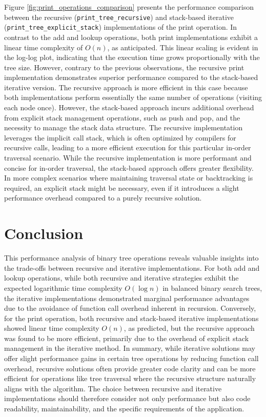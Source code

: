 \documentclass[a4paper,11pt]{article}
\begin{document}
Figure \ref{fig:print_operations_comparison} presents the performance comparison between the recursive (\texttt{print\_tree\_recursive}) and stack-based iterative (\texttt{print\_tree\_explicit\_stack}) implementations of the print operation. In contrast to the add and lookup operations, both print implementations exhibit a linear time complexity of $O(n)$, as anticipated. This linear scaling is evident in the log-log plot, indicating that the execution time grows proportionally with the tree size. However, contrary to the previous observations, the recursive print implementation demonstrates superior performance compared to the stack-based iterative version. The recursive approach is more efficient in this case because both implementations perform essentially the same number of operations (visiting each node once). However, the stack-based approach incurs additional overhead from explicit stack management operations, such as push and pop, and the necessity to manage the stack data structure. The recursive implementation leverages the implicit call stack, which is often optimized by compilers for recursive calls, leading to a more efficient execution for this particular in-order traversal scenario. While the recursive implementation is more performant and concise for in-order traversal, the stack-based approach offers greater flexibility. In more complex scenarios where maintaining traversal state or backtracking is required, an explicit stack might be necessary, even if it introduces a slight performance overhead compared to a purely recursive solution.

\section*{Conclusion}
This performance analysis of binary tree operations reveals valuable insights into the trade-offs between recursive and iterative implementations. For both add and lookup operations, while both recursive and iterative strategies exhibit the expected logarithmic time complexity $O(\log n)$ in balanced binary search trees, the iterative implementations demonstrated marginal performance advantages due to the avoidance of function call overhead inherent in recursion. Conversely, for the print operation, both recursive and stack-based iterative implementations showed linear time complexity $O(n)$, as predicted, but the recursive approach was found to be more efficient, primarily due to the overhead of explicit stack management in the iterative method. In summary, while iterative solutions may offer slight performance gains in certain tree operations by reducing function call overhead, recursive solutions often provide greater code clarity and can be more efficient for operations like tree traversal where the recursive structure naturally aligns with the algorithm. The choice between recursive and iterative implementations should therefore consider not only performance but also code readability, maintainability, and the specific requirements of the application.
\end{document}
